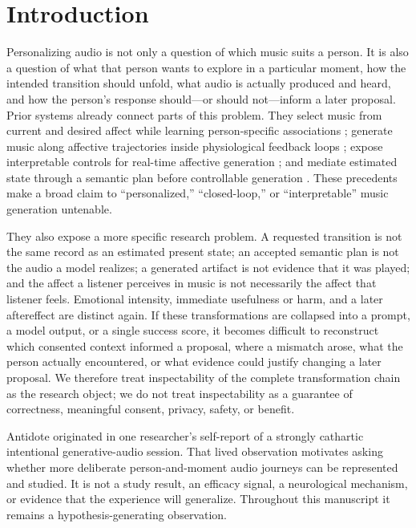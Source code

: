 \section{Introduction}
\label{sec:introduction}

Personalizing audio is not only a question of which music suits a person. It is
also a question of what that person wants to explore in a particular moment,
how the intended transition should unfold, what audio is actually produced and
heard, and how the person's response should---or should not---inform a later
proposal. Prior systems already connect parts of this problem. They select
music from current and desired affect while learning person-specific
associations \citep{janssen2012tune}; generate music along affective
trajectories inside physiological feedback loops
\citep{daly2016abcmi,ehrlich2019closedloop}; expose interpretable controls for
real-time affective generation \citep{agres2023affectmachine}; and mediate
estimated state through a semantic plan before controllable generation
\citep{zhang2026mindmelody}. These precedents make a broad claim to
``personalized,'' ``closed-loop,'' or ``interpretable'' music generation
untenable.

They also expose a more specific research problem. A requested transition is
not the same record as an estimated present state; an accepted semantic plan is
not the audio a model realizes; a generated artifact is not evidence that it
was played; and the affect a listener perceives in music is not necessarily the
affect that listener feels. Emotional intensity, immediate usefulness or harm,
and a later aftereffect are distinct again. If these transformations are
collapsed into a prompt, a model output, or a single success score, it becomes
difficult to reconstruct which consented context informed a proposal, where a
mismatch arose, what the person actually encountered, or what evidence could
justify changing a later proposal. We therefore treat inspectability of the
complete transformation chain as the research object; we do not treat
inspectability as a guarantee of correctness, meaningful consent, privacy,
safety, or benefit.

Antidote originated in one researcher's self-report of a strongly cathartic
intentional generative-audio session. That lived observation motivates asking
whether more deliberate person-and-moment audio journeys can be represented
and studied. It is not a study result, an efficacy signal, a neurological
mechanism, or evidence that the experience will generalize. Throughout this
manuscript it remains a hypothesis-generating observation.


